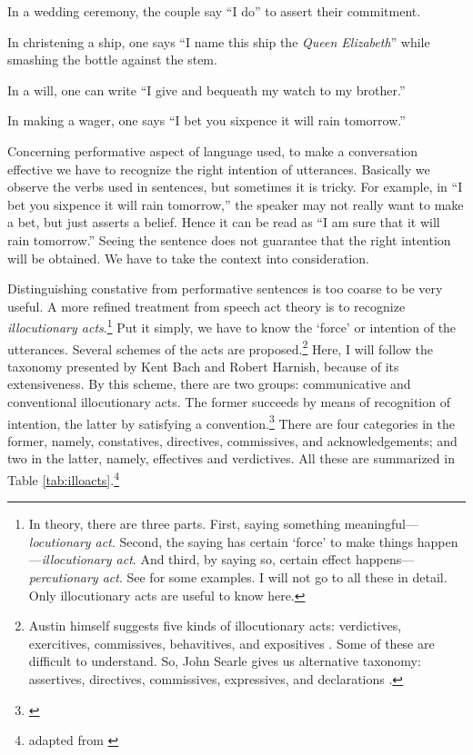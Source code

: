 \begin{compactenum}[(1)]
\item{In a wedding ceremony, the couple say ``I do'' to assert their commitment.}
\item{In christening a ship, one says ``I name this ship the \emph{Queen Elizabeth}'' while smashing the bottle against the stem.}
\item{In a will, one can write ``I give and bequeath my watch to my brother.''}
\item{In making a wager, one says ``I bet you sixpence it will rain tomorrow.''}
\end{compactenum}

Concerning performative aspect of language used, to make a conversation effective we have to recognize the right intention of utterances. Basically we observe the verbs used in sentences, but sometimes it is tricky. For example, in ``I bet you sixpence it will rain tomorrow,'' the speaker may not really want to make a bet, but just asserts a belief. Hence it can be read as ``I am sure that it will rain tomorrow.'' Seeing the sentence does not guarantee that the right intention will be obtained. We have to take the context into consideration.

Distinguishing constative from performative sentences is too coarse to be very useful. A more refined treatment from speech act theory is to recognize \emph{illocutionary acts}.\footnote{In theory, there are three parts. First, saying something meaningful---\emph{locutionary act}. Second, the saying has certain `force' to make things happen---\emph{illocutionary act}. And third, by saying so, certain effect happens---\emph{percutionary act}. See \citealp[pp.~101--2]{austin:how} for some examples. I will not go to all these in detail. Only illocutionary acts are useful to know here.} Put it simply, we have to know the `force' or intention of the utterances. Several schemes of the acts are proposed.\footnote{Austin himself suggests five kinds of illocutionary acts: verdictives, exercitives, commissives, behavitives, and expositives \citep[p.~150]{austin:how}. Some of these are difficult to understand. So, John Searle gives us alternative taxonomy: assertives, directives, commissives, expressives, and declarations \citep[pp.~12--20]{searle:speech}.} Here, I will follow the taxonomy presented by Kent Bach and Robert Harnish, because of its extensiveness. By this scheme, there are two groups: communicative and conventional illocutionary acts. The former succeeds by means of recognition of intention, the latter by satisfying a convention.\footnote{\citealp[p.~110]{bachharnish:speech}} There are four categories in the former, namely, constatives, directives, commissives, and acknowledgements; and two in the latter, namely, effectives and verdictives. All these are summarized in Table \ref{tab:illoacts}.\footnote{adapted from \citealp[pp.~40ff, 110ff]{bachharnish:speech}}


